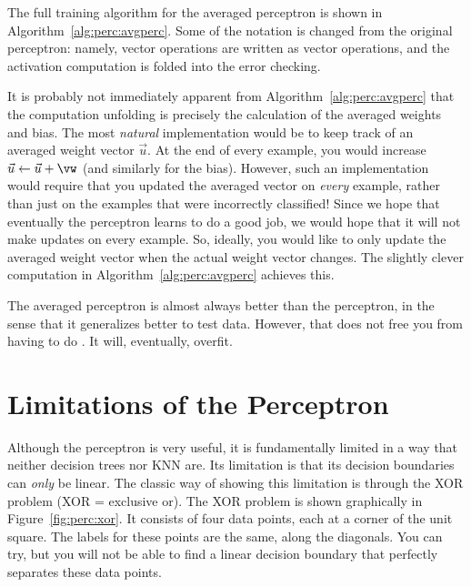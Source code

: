 The full training algorithm for the averaged perceptron is shown in
Algorithm~\ref{alg:perc:avgperc}.  Some of the notation is changed
from the original perceptron: namely, vector operations are written as
vector operations, and the activation computation is folded into the
error checking.

It is probably not immediately apparent from
Algorithm~\ref{alg:perc:avgperc} that the computation unfolding is
precisely the calculation of the averaged weights and bias.  The most
\emph{natural} implementation would be to keep track of an averaged
weight vector $\vec u$.  At the end of every example, you would
increase $\vec u \leftarrow \vec u + \vw$ (and similarly for the
bias).  However, such an implementation would require that you updated
the averaged vector on \emph{every} example, rather than just on the
examples that were incorrectly classified!  Since we hope that
eventually the perceptron learns to do a good job, we would hope that
it will not make updates on every example.  So, ideally, you would
like to only update the averaged weight vector when the actual weight
vector changes.  The slightly clever computation in
Algorithm~\ref{alg:perc:avgperc} achieves this.



The averaged perceptron is almost always better than the perceptron,
in the sense that it generalizes better to test data.  However, that
does not free you from having to do .  It
will, eventually, overfit.  

\section{Limitations of the Perceptron}


Although the perceptron is very useful, it is fundamentally limited in
a way that neither decision trees nor KNN are.  Its limitation is that
its decision boundaries can \emph{only} be linear.  The classic way of
showing this limitation is through the XOR problem (XOR = exclusive
or).  The XOR problem is shown graphically in
Figure~\ref{fig:perc:xor}.  It consists of four data points, each at a
corner of the unit square.  The labels for these points are the same,
along the diagonals.  You can try, but you will not be able to find a
linear decision boundary that perfectly separates these data points.

